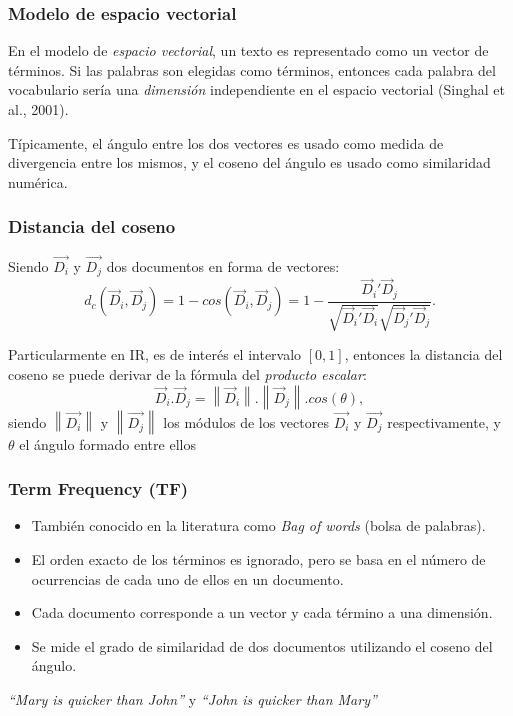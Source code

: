 \begin{frame}
	\frametitle{Modelo de espacio vectorial}
	En el modelo de \textit{espacio vectorial}, un texto es representado como un vector de términos. Si las palabras son elegidas como términos, entonces cada palabra del vocabulario sería una \textit{dimensión} independiente en el espacio vectorial (Singhal et al., 2001).

	\bigskip

	Típicamente, el ángulo entre los dos vectores es usado como medida de divergencia entre los mismos, y el coseno del ángulo es usado como similaridad numérica.
\end{frame}

\begin{frame}
	\frametitle{Distancia del coseno}
	Siendo \(\overrightarrow{D_i}\) y \(\overrightarrow{D_j}\) dos documentos en forma de vectores:
	\[d_c(\vec{D}_i, \vec{D}_j) = 1 - cos(\vec{D}_i, \vec{D}_j) = 1 - \frac{{\vec{D}_i}'\vec{D}_j}{\sqrt{{\vec{D}_i}'\vec{D}_i}\sqrt{{\vec{D}_j}'\vec{D}_j}}.\]

	\bigskip
	Particularmente en IR, es de interés el intervalo \([0, 1]\), entonces la distancia del coseno se puede derivar de la fórmula del \textit{producto escalar}:
	\[\vec{D}_i.\vec{D}_j = \left \| \vec{D}_i \right \|.\left \| \vec{D}_j \right \|.cos(\theta),\]
	siendo \(\left \|\overrightarrow{D_i}\right \|\) y \(\left \|\overrightarrow{D_j}\right \|\) los módulos de los vectores \(\overrightarrow{D_i}\) y \(\overrightarrow{D_j}\) respectivamente, y $\theta$ el ángulo formado entre ellos
\end{frame}

\begin{frame}
	\frametitle{Term Frequency (TF)}
	\begin{itemize}
		\scriptsize
		\item También conocido en la literatura como \textit{Bag of words} (bolsa de palabras).
		\item El orden exacto de los términos es ignorado, pero se basa en el número de ocurrencias de cada uno de ellos en un documento.
		\item Cada documento corresponde a un vector y cada término a una dimensión.
		\item Se mide el grado de similaridad de dos documentos utilizando el coseno del ángulo.
	\end{itemize}

	\bigskip
	\centering
	\textit{“Mary is quicker than John”} y \textit{“John is quicker than Mary”}
\end{frame}


